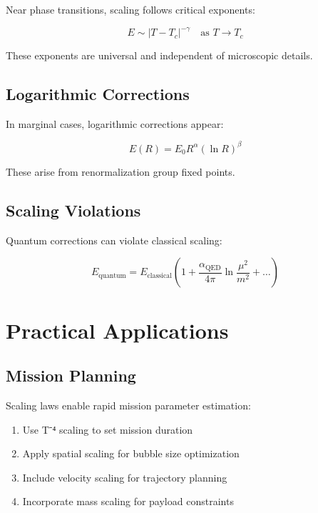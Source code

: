 \documentclass[12pt,a4paper]{article}
\begin{document}
Near phase transitions, scaling follows critical exponents:

\begin{equation}
E \sim |T - T_c|^{-\gamma} \quad \text{as } T \rightarrow T_c
\end{equation}

These exponents are universal and independent of microscopic details.

\subsection{Logarithmic Corrections}

In marginal cases, logarithmic corrections appear:

\begin{equation}
E(R) = E_0 R^\alpha (\ln R)^\beta
\end{equation}

These arise from renormalization group fixed points.

\subsection{Scaling Violations}

Quantum corrections can violate classical scaling:

\begin{equation}
E_{\text{quantum}} = E_{\text{classical}} \left(1 + \frac{\alpha_{\text{QED}}}{4\pi} \ln\frac{\mu^2}{m^2} + \ldots\right)
\end{equation}

\section{Practical Applications}

\subsection{Mission Planning}

Scaling laws enable rapid mission parameter estimation:

\begin{enumerate}
\item Use T⁻⁴ scaling to set mission duration
\item Apply spatial scaling for bubble size optimization
\item Include velocity scaling for trajectory planning
\item Incorporate mass scaling for payload constraints
\end{enumerate}
\end{document}
